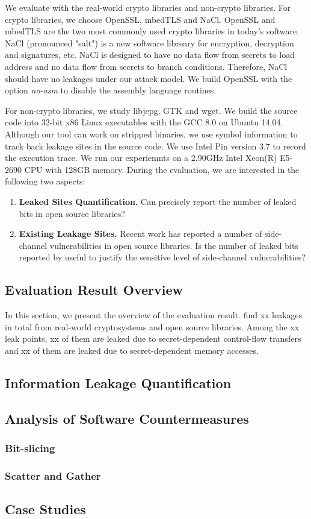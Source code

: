 We evaluate \tool{} with the real-world crypto libraries and non-crypto libraries. 
For crypto libraries, we choose OpenSSL, mbedTLS and NaCl. 
OpenSSL and mbedTLS are the two most commonly used
crypto libraries in today's software. NaCl (pronounced "salt") is a 
new software libreary for encryption, decryption and signatures, etc.
NaCl is designed to have no data flow from secrets to load address and no data 
flow from secrets to branch conditions. Therefore, NaCl should have no leakages
under our attack model. We build OpenSSL with the option \textit{no-asm} 
to disable the assembly language routines. 

For non-crypto libraries, we study libjepg, GTK and wget.
We build the source code into 32-bit x86 Linux executables with the 
GCC 8.0 on Ubuntu 14.04. Although our tool can
work on stripped binaries, we use symbol information to track
back leakage sites in the source code. We use Intel Pin version 3.7 
to record the execution trace. We run our experiemnts on a 2.90GHz
Intel Xeon(R) E5-2690 CPU with 128GB memory.
During the evaluation, we are interested in the following two
aspects:
\begin{enumerate}
    
    \item \textbf{Leaked Sites Quantification.} Can \tool{} precisely
    report the number of leaked bits in open source libraries?
    \item \textbf{Existing Leakage Sites.} Recent work has reported a number
    of side-channel vulnerabilities in open source libraries. 
    Is the number of leaked bits reported by \tool{} useful to justify 
    the sensitive level of side-channel vulnerabilities?
   
\end{enumerate}

\subsection{Evaluation Result Overview}
In this section, we present the overview of the evaluation result. \tool
find xx leakages in total from real-world cryptosystems and open
source libraries. Among the xx leak points, xx of them are leaked due
to secret-dependent control-flow transfers and xx of them are leaked  
due to secret-dependent memory accesses. 

\subsection{Information Leakage Quantification}
\subsection{Analysis of Software Countermeasures}
\subsubsection{Bit-slicing}
\subsubsection{Scatter and Gather}
\subsection{Case Studies}

